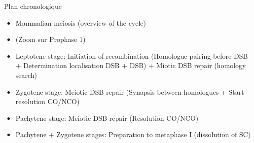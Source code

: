 %
%



Plan chronologique
\begin{itemize}
	\item Mammalian meiosis (overview of the cycle)
	\item (Zoom sur Prophase 1)
	\item Leptotene stage: Initiation of recombination (Homologue pairing before DSB + Determination localisation DSB + DSB) + Miotic DSB repair (homology search)
	\item Zygotene stage: Meiotic DSB repair (Synapsis between homologues + Start resolution CO/NCO)
	\item Pachytene stage: Meiotic DSB repair (Resolution CO/NCO)
	\item Pachytene + Zygotene stages: Preparation to metaphase I (dissolution of SC)

\end{itemize}


